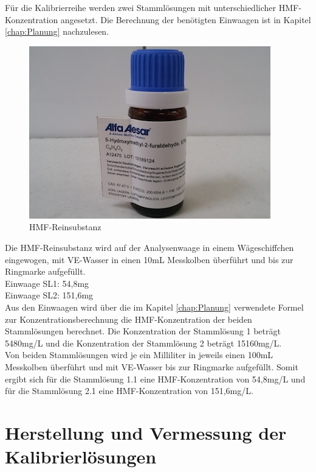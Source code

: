 Für die Kalibrierreihe werden zwei Stammlösungen mit unterschiedlicher HMF-Konzentration angesetzt. Die Berechnung der benötigten Einwaagen ist in Kapitel \ref{chap:Planung} nachzulesen.\\
\begin{figure}[htbp]
	\centering
		\includegraphics{../Bilder/20150504_140727.jpg}
	\caption{HMF-Reinsubstanz}
	\label{fig:HMF-Reinsubstanz}
\end{figure}
Die HMF-Reinsubstanz wird auf der Analysenwaage in einem Wägeschiffchen eingewogen, mit VE-Wasser in einen 10mL Messkolben überführt und bis zur Ringmarke aufgefüllt.\\
Einwaage SL1: 54,8mg\\
Einwaage SL2: 151,6mg\\
Aus den Einwaagen wird über die im Kapitel \ref{chap:Planung} verwendete Formel zur Konzentrationsberechnung die HMF-Konzentration der beiden Stammlösungen berechnet. Die Konzentration der Stammlösung 1 beträgt 5480mg/L und die Konzentration der Stammlösung 2 beträgt 15160mg/L.\\ 
Von beiden Stammlösungen wird je ein Milliliter in jeweils einen 100mL Messkolben überführt und mit VE-Wasser bis zur Ringmarke aufgefüllt. Somit ergibt sich für die Stammlösung 1.1 eine HMF-Konzentration von 54,8mg/L und für die Stammlösung 2.1 eine HMF-Konzentration von 151,6mg/L. 

\section{Herstellung und Vermessung der Kalibrierlösungen}

